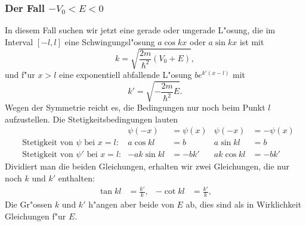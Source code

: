 \subsubsection{Der Fall $-V_0 < E < 0$}
In diesem Fall suchen wir jetzt eine gerade oder ungerade L"osung, die
im Interval $[-l,l]$ eine Schwingungsl"osung $a \cos kx$ oder $a \sin kx$
ist mit 
\[
k=\sqrt{\frac{2m}{\hbar^2}(V_0+E)},
\]
und f"ur $x>l$ eine exponentiell abfallende L"osung $be^{k'(x-l)}$
mit
\[
k'=\sqrt{-\frac{2m}{\hbar^2}E}.
\]
Wegen der Symmetrie reicht es, die Bedingungen nur noch beim
Punkt $l$ aufzustellen.
Die Stetigkeitsbedingungen lauten 
\begin{align*}
&&\psi(-x)&=\psi(x)	&	\psi(-x)&=-\psi(x)\\
&\text{Stetigkeit von $\psi$ bei $x=l$:}&
	a\cos kl&= b	&	a\sin kl&=b \\
&\text{Stetigkeit von $\psi'$ bei $x=l$:}&
	-ak\sin kl&=-bk'&     ak\cos kl&=-bk'
\end{align*}
Dividiert man die beiden Gleichungen, erhalten wir zwei
Gleichungen, die nur noch $k$ und $k'$ enthalten:
\begin{align}
\tan kl&=\frac{k'}{k},
&-\cot kl&=\frac{k'}{k},
\label{skript:potentialtopf-k-gleichungen}
\end{align}
Die Gr"ossen $k$ und $k'$ h"angen aber beide von $E$ ab, dies sind
als in Wirklichkeit Gleichungen f"ur $E$.

